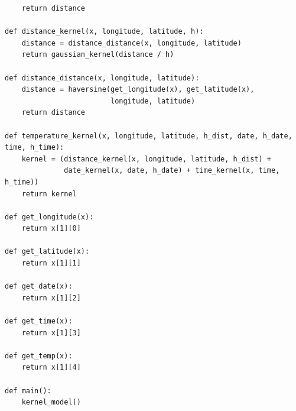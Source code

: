 \documentclass[10pt]{article}
\begin{document}
\begin{verbatim}
    return distance

def distance_kernel(x, longitude, latitude, h):
    distance = distance_distance(x, longitude, latitude)
    return gaussian_kernel(distance / h)

def distance_distance(x, longitude, latitude):
    distance = haversine(get_longitude(x), get_latitude(x),
                         longitude, latitude)
    return distance

def temperature_kernel(x, longitude, latitude, h_dist, date, h_date, time, h_time):
    kernel = (distance_kernel(x, longitude, latitude, h_dist) +
              date_kernel(x, date, h_date) + time_kernel(x, time, h_time))
    return kernel

def get_longitude(x):
    return x[1][0]

def get_latitude(x):
    return x[1][1]

def get_date(x):
    return x[1][2]

def get_time(x):
    return x[1][3]

def get_temp(x):
    return x[1][4]

def main():
    kernel_model()
\end{verbatim}
\end{document}
